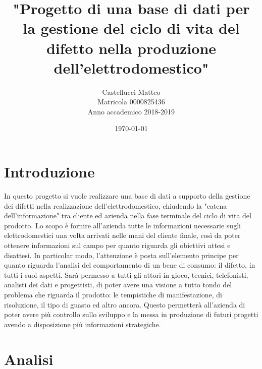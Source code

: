 \documentclass[a4paper, 12pt]{report}
\title{"Progetto di una base di dati per la gestione del ciclo di vita del difetto nella produzione dell'elettrodomestico"}
\author{Castellucci Matteo\\Matricola 0000825436\\Anno accademico 2018-2019}
\date{\today}
\begin{document}
\maketitle

\tableofcontents

\chapter{Introduzione}
In questo progetto si vuole realizzare una base di dati a supporto della gestione dei difetti nella realizzazione dell'elettrodomestico,
chiudendo la "catena dell'informazione" tra cliente ed azienda nella fase terminale del ciclo di vita del prodotto. Lo scopo è fornire
all'azienda tutte le informazioni necessarie sugli elettrodomestici una volta arrivati nelle mani del cliente finale, così da poter
ottenere informazioni sul campo per quanto riguarda gli obiettivi attesi e disattesi. In particolar modo, l'attenzione è posta sull'elemento
principe per quanto riguarda l'analisi del comportamento di un bene di consumo: il difetto, in tutti i suoi aspetti. Sarà permesso a tutti gli
attori in gioco, tecnici, telefonisti, analisti dei dati e progettisti, di poter avere una visione a tutto tondo del problema che riguarda
il prodotto: le tempistiche di manifestazione, di risoluzione, il tipo di guasto ed altro ancora. Questo permetterà all'azienda di poter
avere più controllo sullo sviluppo e la messa in produzione di futuri progetti avendo a disposizione più informazioni strategiche.

\chapter{Analisi}
\end{document}
